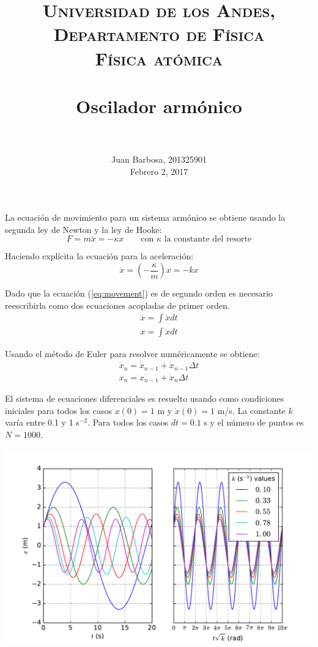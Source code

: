 \documentclass[paper=letter, fontsize=11pt]{scrartcl}
\title{
        \usefont{OT1}{bch}{b}{n}
        \normalfont \normalsize \textsc{Universidad de los Andes, Departamento de F\'isica \\
        F\'isica at\'omica} \\ [25pt]
        \horrule{0.5pt} \\[0.4cm]
        \huge Oscilador arm\'onico \\
        \horrule{2pt} \\[0.5cm]
}
\author{
        \normalfont                                 \normalsize
        Juan Barbosa, 201325901\\[-3pt]      \normalsize
        Febrero 2, 2017
}
\date{}
\begin{document}
\maketitle

La ecuaci\'on de movimiento para un sistema arm\'onico se obtiene usando la segunda ley de Newton y la ley de Hooke:
\begin{equation*}
	F = m\ddot{x} = -\kappa x \qquad \text{con $\kappa$ la constante del resorte}
\end{equation*}

Haciendo expl\'icita la ecuaci\'on para la aceleraci\'on:
\begin{equation}\label{eq:movement}
	\ddot{x} = \left(-\dfrac{\kappa}{m}\right)x = -kx
\end{equation}

Dado que la ecuaci\'on (\ref{eq:movement}) es de segundo orden es necesario reescribirla como dos ecuaciones acopladas de primer orden. 
\begin{equation}
	\begin{matrix}
		\dot{x} = \int\ddot{x}dt \\
		x = \int\dot{x}dt
	\end{matrix}
\end{equation}

Usando el m\'etodo de Euler para resolver num\'ericamente se obtiene:
\begin{equation}
	\begin{matrix}
	\dot{x}_n = \dot{x}_{n-1} + \ddot{x}_{n-1}\Delta t \\
	x_n = x_{n-1} + \dot{x}_n\Delta t
	\end{matrix}
\end{equation}

El sistema de ecuaciones diferenciales es resuelto usando como condiciones iniciales para todos los casos $x(0) = 1$ m y $\dot{x}(0) = 1$ m/s. La constante $k$ var\'ia entre 0.1 y 1 s$^{-2}$. Para todos los casos $dt = 0.1$ s y el n\'umero de puntos es $N = 1000$. 

\begin{center}
	\includegraphics[width=0.9\linewidth]{plot.pdf}
\end{center}
\end{document}

